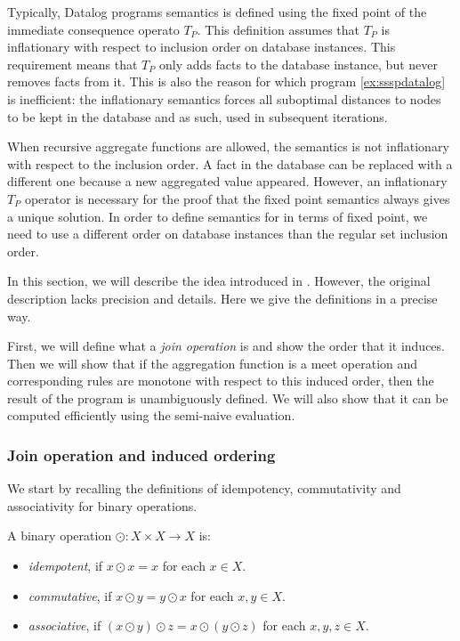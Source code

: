 Typically, Datalog programs semantics is defined using the fixed point of the immediate consequence operato $T_P$. This definition assumes that $T_P$ is inflationary with respect to inclusion order on database instances. This requirement means that $T_P$ only adds facts to the database instance, but never removes facts from it. This is also the reason for which program \ref{ex:ssspdatalog} is inefficient: the inflationary semantics forces all suboptimal distances to nodes to be kept in the database and as such, used in subsequent iterations.

When recursive aggregate functions are allowed, the semantics is not inflationary with respect to the inclusion order. A fact in the database can be replaced with a different one because a new aggregated value appeared. However, an inflationary $T_P$ operator is necessary for the proof that the fixed point semantics always gives a unique solution. In order to define semantics for \datalogra in terms of fixed point, we need to use a different order on database instances than the regular set inclusion order.

In this section, we will describe the idea introduced in \cite{socialite}. However, the original description lacks precision and details. Here we give the definitions in a precise way.

First, we will define what a \emph{join operation} is and show the order that it induces. Then we will show that if the aggregation function is a meet operation and corresponding rules are monotone with respect to this induced order, then the result of the program is unambiguously defined. We will also show that it can be computed efficiently using the semi-naive evaluation.

\subsubsection{Join operation and induced ordering}
We start by recalling the definitions of idempotency, commutativity and associativity for binary operations.
\begin{defn}
A binary operation $\odot: X \times X \to X$ is:
\begin{itemize}
\item \emph{idempotent}, if $x \odot x = x$ for each $x \in X$.
\item \emph{commutative}, if $x \odot y = y \odot x$ for each $x, y \in X$.
\item \emph{associative}, if $(x \odot y) \odot z = x \odot (y \odot z)$ for each $x, y, z \in X$.
\end{itemize}
\end{defn}

